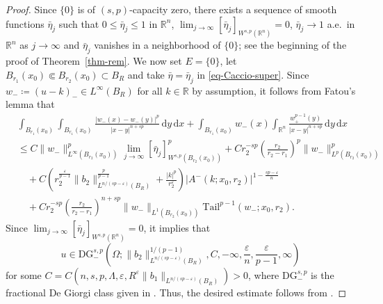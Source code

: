 \documentclass[11pt]{amsart}
\theoremstyle{plain}
\theoremstyle{definition}
\numberwithin{equation}{section}
\begin{document}
\begin{proof}
Since $\{0\}$ is of $(s, p)$-capacity zero, there exists a sequence of smooth functions $\bar{\eta}_j$ such that $0\leq \bar{\eta}_j\leq 1$ in $\mathbb{R}^n$, $\lim_{j \to \infty} [\bar{\eta}_j]_{W^{s, p}(\mathbb{R}^n)}=0$, $\bar{\eta}_j \to 1$ a.e.\ in $\mathbb{R}^n$ as $j \to \infty$ and $\bar{\eta}_j$ vanishes in a neighborhood of $\{0\}$; see the beginning of the proof of Theorem~\ref{thm-rem}. We now set $E=\{0\}$, let $B_{r_1}(x_0) \Subset B_{r_2}(x_0) \subset B_R$ and take $\bar{\eta}=\bar{\eta}_j$ in \eqref{eq-Caccio-super}. Since $w_-\coloneqq (u-k)_- \in L^\infty(B_R)$ for all $k \in \mathbb{R}$ by assumption, it follows from Fatou's lemma that
\begin{equation*}
\begin{split}
&\int_{B_{r_1}(x_0)} \int_{B_{r_1}(x_0)} \frac{|w_-(x)-w_-(y)|^p}{|x-y|^{n+sp}} \,\mathrm{d}y\,\mathrm{d}x + \int_{B_{r_1}(x_0)} w_-(x) \int_{\mathbb{R}^n} \frac{w_+^{p-1}(y)}{|x-y|^{n+sp}} \,\mathrm{d}y \,\mathrm{d}x \\
&\leq C\|w_-\|_{L^\infty(B_{r_2}(x_0))}^p \lim_{j \to \infty} [\bar{\eta}_j]_{W^{s, p}(B_{r_2}(x_0))}^p + C r_2^{-sp} \left( \frac{r_2}{r_2-r_1} \right)^p \|w_-\|_{L^p(B_{r_2}(x_0))}^p \\
&\quad + C \left( r_2^{\frac{\varepsilon}{p-1}}\|b_2\|^{\frac{p}{p-1}}_{L^{n/(sp-\varepsilon)}(B_R)} + \frac{|k|^p}{r_2^{\varepsilon}} \right) |A^-(k; x_0, r_2)|^{1-\frac{sp-\varepsilon}{n}} \\
&\quad + C r_2^{-sp} \left( \frac{r_2}{r_2-r_1} \right)^{n+sp} \|w_-\|_{L^1(B_{r_2}(x_0))} \mathrm{Tail}^{p-1}(w_-; x_0, r_2).
\end{split}
\end{equation*}
Since $\lim_{j \to \infty} [\bar{\eta}_j]_{W^{s, p}(\mathbb{R}^n)}=0$, it implies that
\begin{equation*}
    u \in \mathrm{DG}_-^{s, p}\left(\Omega; \|b_2\|^{1/(p-1)}_{L^{n/(sp-\varepsilon)}(B_R)}, C, -\infty, \frac{\varepsilon}{n}, \frac{\varepsilon}{p-1}, \infty \right)
\end{equation*}
for some $C=C(n, s, p, \Lambda, \varepsilon, R^\varepsilon \|b_1\|_{L^{n/(sp-\varepsilon)}(B_R)})>0$, where $\mathrm{DG}_-^{s,p}$ is the fractional De Giorgi class given in \cite[Section~6.1]{Coz17}. Thus, the desired estimate follows from \cite[Proposition~6.8]{Coz17}.
\end{proof}
\end{document}
